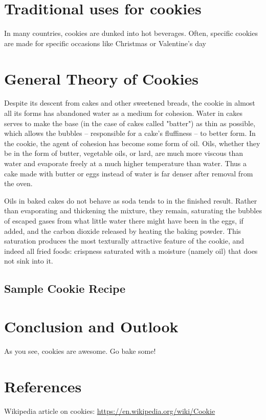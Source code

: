 \documentclass[a4paper]{article}
\begin{document}
\section{Traditional uses for cookies}
In many countries, cookies are dunked into hot beverages.
Often, specific cookies are made for specific occasions like Christmas or Valentine's day

\section{General Theory of Cookies}
Despite its descent from cakes and other sweetened breads, the cookie in almost all its forms has abandoned water as a medium for cohesion. 
Water in cakes serves to make the base (in the case of cakes called "batter") as thin as possible, which allows the bubbles – responsible for a cake's fluffiness – to better form. 
In the cookie, the agent of cohesion has become some form of oil. 
Oils, whether they be in the form of butter, vegetable oils, or lard, are much more viscous than water and evaporate freely at a much higher temperature than water. 
Thus a cake made with butter or eggs instead of water is far denser after removal from the oven.

Oils in baked cakes do not behave as soda tends to in the finished result. 
Rather than evaporating and thickening the mixture, they remain, saturating the bubbles of escaped gases from what little water there might have been in the eggs, if added, and the carbon dioxide released by heating the baking powder. 
This saturation produces the most texturally attractive feature of the cookie, and indeed all fried foods: crispness saturated with a moisture (namely oil) that does not sink into it. 

\subsection{Sample Cookie Recipe}

\section{Conclusion and Outlook}
As you see, cookies are awesome. Go bake some!

\section{References}
Wikipedia article on cookies: \url{https://en.wikipedia.org/wiki/Cookie}
\end{document}
